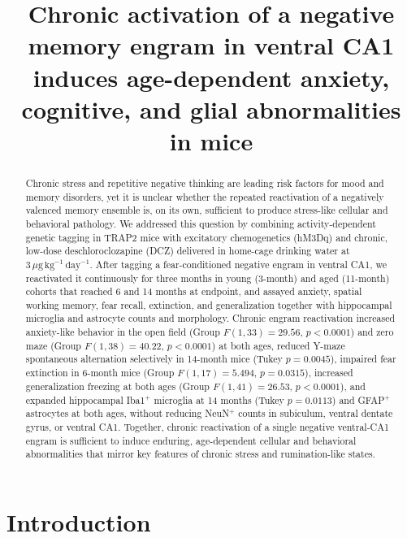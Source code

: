 \documentclass[11pt]{article}
\title{Chronic activation of a negative memory engram in ventral CA1 induces age-dependent anxiety, cognitive, and glial abnormalities in mice}
\author{}
\date{}
\begin{document}
\maketitle

\begin{abstract}
Chronic stress and repetitive negative thinking are leading risk factors for mood and memory disorders, yet it is unclear whether the repeated reactivation of a negatively valenced memory ensemble is, on its own, sufficient to produce stress-like cellular and behavioral pathology. We addressed this question by combining activity-dependent genetic tagging in TRAP2 mice with excitatory chemogenetics (hM3Dq) and chronic, low-dose deschloroclozapine (DCZ) delivered in home-cage drinking water at $3\,\mu\mathrm{g}\,\mathrm{kg}^{-1}\,\mathrm{day}^{-1}$. After tagging a fear-conditioned negative engram in ventral CA1, we reactivated it continuously for three months in young (3-month) and aged (11-month) cohorts that reached 6 and 14 months at endpoint, and assayed anxiety, spatial working memory, fear recall, extinction, and generalization together with hippocampal microglia and astrocyte counts and morphology. Chronic engram reactivation increased anxiety-like behavior in the open field (Group $F(1,33)=29.56$, $p<0.0001$) and zero maze (Group $F(1,38)=40.22$, $p<0.0001$) at both ages, reduced Y-maze spontaneous alternation selectively in 14-month mice (Tukey $p=0.0045$), impaired fear extinction in 6-month mice (Group $F(1,17)=5.494$, $p=0.0315$), increased generalization freezing at both ages (Group $F(1,41)=26.53$, $p<0.0001$), and expanded hippocampal Iba1$^{+}$ microglia at 14 months (Tukey $p=0.0113$) and GFAP$^{+}$ astrocytes at both ages, without reducing NeuN$^{+}$ counts in subiculum, ventral dentate gyrus, or ventral CA1. Together, chronic reactivation of a single negative ventral-CA1 engram is sufficient to induce enduring, age-dependent cellular and behavioral abnormalities that mirror key features of chronic stress and rumination-like states.
\end{abstract}

\section{Introduction}
\end{document}

